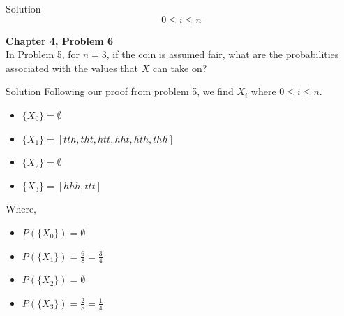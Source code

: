 \documentclass{article}
\begin{document}
\begin{spacing}{1.1}
\begin{homeworkProblem}
\begin{homeworkSection}{Solution}
    \[0 \le i \le n\]

  \end{homeworkSection}
\end{homeworkProblem}

\newpage
\begin{homeworkProblem}
  {\bf Chapter 4, Problem 6}\\
  In Problem 5, for $n = 3$, if the coin is assumed fair, what are 
  the probabilities associated with the values that $X$ can take on?
  \begin{homeworkSection}{Solution}
    Following our proof from problem 5, we find $X_i$ where 
    $0 \le i \le n$.
    \begin{itemize}
      \item $\{X_0\} = \emptyset$
      \item $\{X_1\} = [tth, tht, htt, hht, hth, thh]$
      \item $\{X_2\} = \emptyset$
      \item $\{X_3\} = [hhh,ttt]$
    \end{itemize}
    Where,
    \begin{itemize}
      \item $P( \{X_0\}) = \emptyset$
      \item $P( \{X_1\}) = \frac{ 6}{ 8} = \frac{ 3}{ 4}$
      \item $P( \{X_2\}) = \emptyset$
      \item $P( \{X_3\}) = \frac{ 2}{ 8} = \frac{ 1}{ 4}$
    \end{itemize}
  \end{homeworkSection}
\end{homeworkProblem}


\end{spacing}
\end{document}
